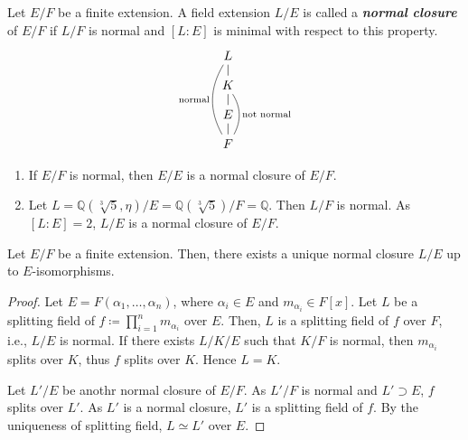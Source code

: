 \documentclass[twoside]{article}
\newcommand\Q{\mathbb Q}
\theoremstyle{remark}
\newcounter{theorem}
\newcommand*\term[1]{\textbf{\textit{\mathversion{bold}#1}}}
\begin{document}
\begin{definition}
  Let \(E/F\) be a finite extension. A field extension \(L/E\) is called a \term{normal closure} of \(E/F\) if \(L/F\) is normal and \([L:E]\) is minimal with respect to this property.
  \begin{displaymath}
    \begin{tikzcd}[row sep=small]
      L\arrow[ddd,dash,bend right,"\text{normal}"swap]\dar[dash] \\
      K\arrow[dd,dash,bend left,"\text{not normal}"]\dar[dash] \\
      E\dar[dash] \\
      F
    \end{tikzcd}
  \end{displaymath}
\end{definition}

\begin{examples}
  \begin{enumerate}[label=\arabic*.]
    \item If \(E/F\) is normal, then \(E/E\) is a normal closure of \(E/F\).
    \item Let \(L = \Q(\sqrt[3]5,\eta) / E = \Q(\sqrt[3]5) / F = \Q\). Then \(L/F\) is normal. As \([L:E] = 2\), \(L/E\) is a normal closure of \(E/F\).
  \end{enumerate}
\end{examples}

\begin{theorem}
  Let \(E/F\) be a finite extension. Then, there exists a unique normal closure \(L/E\) up to \(E\)-isomorphisms.
\end{theorem}

\begin{proof}
  Let \(E = F(\alpha_1, \dots, \alpha_n)\), where \(\alpha_i \in E\) and \(m_{\alpha_i} \in F[x]\). Let \(L\) be a splitting field of \(f\coloneq \prod_{i=1}^n m_{\alpha_i}\) over \(E\). Then, \(L\) is a splitting field of \(f\) over \(F\), i.e., \(L/E\) is normal. If there exists \(L/K/E\) such that \(K/F\) is normal, then \(m_{\alpha_i}\) splits over \(K\), thus \(f\) splits over \(K\). Hence \(L=K\).
  
  Let \(L'/E\) be anothr normal closure of \(E/F\). As \(L'/F\) is normal and \(L' \supset E\), \(f\) splits over \(L'\). As \(L'\) is a normal closure, \(L'\) is a splitting field of \(f\). By the uniqueness of splitting field, \(L \simeq L'\) over \(E\).
\end{proof}
\end{document}

